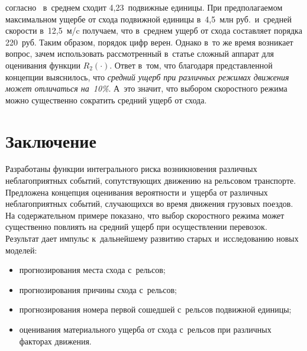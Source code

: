 \begin{multicols}{2}
\vspace*{6pt}


\noindent
   согласно~\cite{7-bos} в~среднем сходит 
4,23~по\-движ\-ные единицы. При предполагаемом максимальном ущербе от схода 
по\-движ\-ной единицы в~4,5~млн руб.\ и~сред\-ней ско\-рости в~12,5~м/c получаем, что 
в~сред\-нем ущерб от схода со\-став\-ля\-ет порядка 220~руб. Таким образом, порядок 
цифр верен. Однако в~то же время возникает вопрос, зачем использовать 
рас\-смот\-рен\-ный в~\mbox{статье} слож\-ный аппарат для оценивания функции $R_2(\cdot)$. 
Ответ в~том, что благодаря пред\-став\-лен\-ной концепции выяснилось, что 
\textit{сред\-ний ущерб при различных режимах движения может отличаться на~10\%}. 
А~это значит, что выбором скоростного режима мож\-но 
существенно со\-кра\-тить сред\-ний ущерб от схода.


\vspace*{-9pt}
     
\section{Заключение}

\vspace*{-3pt}

     Разработаны функции интегрального рис\-ка возникновения различных 
неблагоприятных событий, со\-пут\-ст\-ву\-ющих движению на рельсовом транспорте. 
Предложена концепция оценивания ве\-ро\-ят\-ности и~ущер\-ба от различных 
неблагоприятных событий, слу\-ча\-ющих\-ся во время движения грузовых поездов. 
На содержательном примере показано, что выбор скоростного режима может 
существенно по\-вли\-ять на сред\-ний ущерб при осуществлении перевозок. Результат 
дает импульс к~дальнейшему развитию старых и~исследованию новых моделей:
     \begin{itemize}
  \item прогнозирования места схода с~рельсов;
  \item прогнозирования причины схода с~рельсов;
  \item прогнозирования номера пер\-вой сошедшей с~рельсов по\-движ\-ной единицы;
  \item оценивания материального ущерба от схода с~рельсов при различных 
факторах дви\-жения.
  \end{itemize}
  
  \vspace*{-6pt}
  

\end{multicols}
